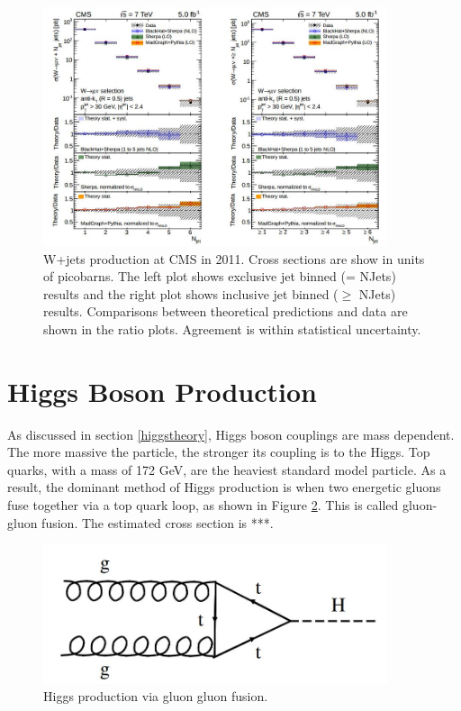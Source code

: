\documentclass[oneside, letterpaper, oldfontcommands]{memoir}
\begin{document}
\begin{figure}[here]
\includegraphics[width=0.9\textwidth]{wjets7TeV.jpg}
\caption{W+jets production at CMS in 2011. Cross sections are show in units of picobarns. The left plot shows exclusive jet binned (= NJets) results and the right plot shows inclusive jet binned ($\geq$ NJets) results. Comparisons between theoretical predictions and data are shown in the ratio plots. Agreement is within statistical uncertainty. }
\label{fig:wjets7TeV}
\end{figure}


\section{Higgs Boson Production}\label{higgspheno}
\qquad As discussed in section \ref{higgstheory}, Higgs boson couplings are mass dependent. The more massive the particle, the stronger its coupling is to the Higgs. Top quarks, with a mass of 172 GeV, are the heaviest standard model particle. As a result, the dominant method of Higgs production is when two energetic gluons fuse together via a top quark loop, as shown in Figure \ref{fig:ggfHiggs}. This is called gluon-gluon fusion. The estimated cross section is ***.

\begin{figure}[here]
\includegraphics[width=0.9\textwidth]{ggfHiggs.jpg}
\caption{Higgs production via gluon gluon fusion.}
\label{fig:ggfHiggs}
\end{figure}
\end{document}
